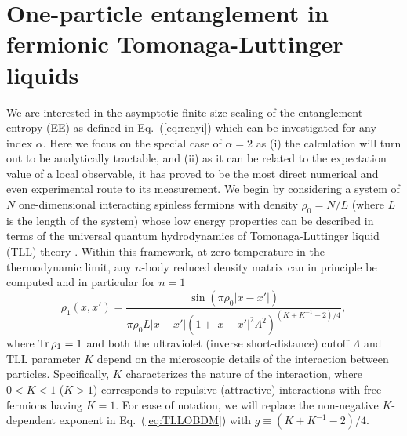 \section{One-particle entanglement in fermionic Tomonaga-Luttinger liquids}
We are interested in the asymptotic finite size scaling of the entanglement
entropy (EE) as defined in Eq.~(\ref{eq:renyi}) which can be investigated for
any \ren index $\alpha$.  Here we focus on the special case of $\alpha=2$ as
(i) the calculation will turn out to be analytically tractable, and
(ii) as it can be related to the expectation value of a local observable, it
has proved to be the most direct numerical
\cite{Hastings:2010dc,Grover:2013cs,McMinis:2013dp,Drut:2015fs} and even experimental
\cite{Islam:2015cm,Melko:2016bo} route to its measurement. We begin by considering a system
of $N$ one-dimensional interacting spinless fermions with density $\rho_0=N/L$ (where $L$
is the length of the system) whose low energy properties can be described in
terms of the universal quantum hydrodynamics of 
Tomonaga-Luttinger liquid (TLL) theory \cite{Tomonaga1951, Haldane1981}.
Within this framework, at zero temperature in the thermodynamic limit, any
$n$-body reduced density matrix can in principle be computed
\cite{giamarchi:2004qu} and in particular for $n=1$ \cite{Dzyaloshinskii:1974un}
%
\begin{equation}
\rho_1\left(x,x'\right)=\frac{\sin(\pi \rho_0|x-x'|)}{\pi
\rho_0L|x-x'|(1+|x-x'|^2\Lambda^2)^{(K+K^{-1}-2)/4}},
\label{eq:TLLOBDM}
\end{equation}
%
where $\operatorname{Tr} \rho_1 = 1$ and both the ultraviolet (inverse short-distance) cutoff
$\Lambda$ and TLL parameter $K$ depend on the microscopic details of the
interaction between particles. Specifically, $K$ characterizes the nature of
the interaction, where $0<K<1$ ($K>1$) corresponds to repulsive (attractive)
interactions with free fermions having $K=1$.  For ease of notation, we will
replace the non-negative $K$-dependent exponent in Eq.~(\ref{eq:TLLOBDM}) with
$g\equiv(K+K^{-1}-2)/4$.  

